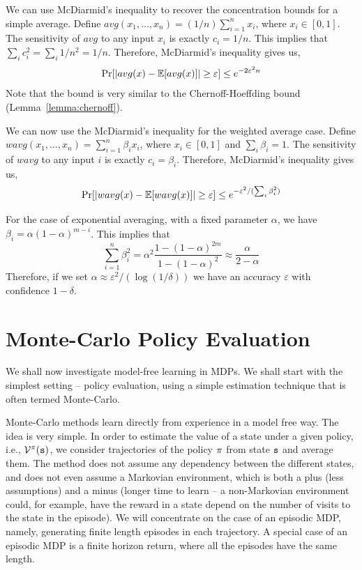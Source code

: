 {We can use McDiarmid's inequality to recover the concentration bounds
for a simple average. Define $avg(x_1, \ldots ,
x_n)=(1/n)\sum_{i=1}^n x_i$, where $x_i\in[0,1]$. The sensitivity of
$avg$ to any input $x_i$ is exactly $c_i=1/n$. This implies that
$\sum_i c_i^2=\sum_i 1/n^2=1/n$. Therefore, McDiarmid's inequality
gives us,
\[
\Pr[|avg(x)-\mathbb{E}[avg(x)]|\geq \varepsilon]\leq e^{-2\varepsilon^2n}
\]
Note that the bound is very similar to the Chernoff-Hoeffding bound
(Lemma~\ref{lemma:chernoff}).

We can now use the McDiarmid's inequality for the weighted average
case. Define $wavg(x_1, \ldots , x_n)=\sum_{i=1}^n \beta_i x_i$,
where $x_i\in[0,1]$ and $\sum_i \beta_i=1$. The sensitivity of
$wavg$ to any input $i$ is exactly $c_i=\beta_i$.
Therefore, McDiarmid's inequality gives us,
\[
\Pr[|wavg(x)-\mathbb{E}[wavg(x)]|\geq \varepsilon]\leq
e^{-\varepsilon^2/(\sum_i \beta_i^2)}
\]

For the case of exponential averaging, with a fixed parameter $\alpha$, we have $\beta_i=\alpha(1-\alpha)^{m-i}$. This implies
that
\[
\sum_{i=1}^n \beta_i^2 =
\alpha^2\frac{1-(1-\alpha)^{2m}}{1-(1-\alpha)^2}\approx
\frac{\alpha}{2-\alpha}
\]
Therefore, if we set $\alpha\approx \varepsilon^2/(\log (1/\delta))$
we have an accuracy $\varepsilon$ with confidence $1-\delta$.
}


\section{Monte-Carlo Policy Evaluation}
\label{sec:MC}
We shall now investigate model-free learning in MDPs. We shall start with the simplest setting -- policy evaluation, using a simple estimation technique that is often termed Monte-Carlo. 


Monte-Carlo methods learn directly from experience in a model free
way. The idea is very simple. In order to estimate the value of a
state under a given policy, i.e., $\mathcal{V}^\pi({\tt s})$, we
consider trajectories of the policy $\pi$ from state ${\tt s}$
and average them. The method does not assume any dependency between
the different states, and does not even assume a Markovian
environment, which is both a plus (less assumptions) and a minus
(longer time to learn -- a non-Markovian environment could, for
example, have the reward in a state depend on the number of visits
to the state in the episode). We will concentrate on the case of an
episodic MDP, namely, generating finite length episodes in each
trajectory. A special case of an episodic MDP is a finite horizon
return, where all the episodes have the same length.

